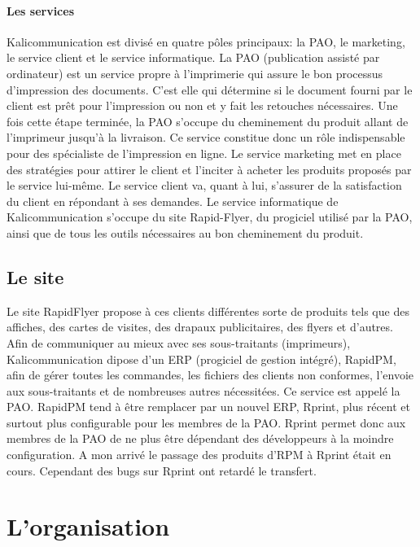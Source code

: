 \documentclass[a4paper]{report}
\begin{document}
\subsubsection{Les services}
Kalicommunication est divisé en quatre pôles principaux: la PAO, le marketing, le service client et le service informatique.\newline
La PAO (publication assisté par ordinateur) est un service propre à l'imprimerie qui assure le bon processus d'impression des documents. C'est elle qui détermine si le document fourni par le client est prêt pour l'impression ou non et y fait les retouches nécessaires. Une fois cette étape terminée, la PAO s'occupe du cheminement du produit allant de l'imprimeur jusqu'à la livraison. Ce service constitue donc un rôle indispensable pour des spécialiste de l'impression en ligne.\newline
Le service marketing met en place des stratégies pour attirer le client et l'inciter à acheter les produits proposés par le service lui-même.\newline
Le service client va, quant à lui, s'assurer de la satisfaction du client en répondant à ses demandes.\newline
Le service informatique de Kalicommunication s'occupe du site Rapid-Flyer, du progiciel utilisé par la PAO, ainsi que de tous les outils nécessaires au bon cheminement du produit.
\section{Le site}
Le site RapidFlyer propose à ces clients différentes sorte de produits tels que des affiches, des cartes de visites, des drapaux publicitaires, des flyers et d’autres. 
Afin de communiquer au mieux avec ses sous-traitants (imprimeurs), Kalicommunication dipose d’un ERP (progiciel de gestion intégré), RapidPM, afin de gérer toutes les commandes, les fichiers des clients non conformes, l’envoie aux sous-traitants et de nombreuses autres nécessitées. Ce service est appelé la PAO. RapidPM tend à être remplacer par un nouvel ERP, Rprint, plus récent et surtout plus configurable pour les membres de la PAO. Rprint permet donc aux membres de la PAO de ne plus être dépendant des développeurs à la moindre configuration. A mon arrivé le passage des produits d’RPM à Rprint était en cours. Cependant des bugs sur Rprint ont retardé le transfert. %

\chapter{L'organisation}
\end{document}
